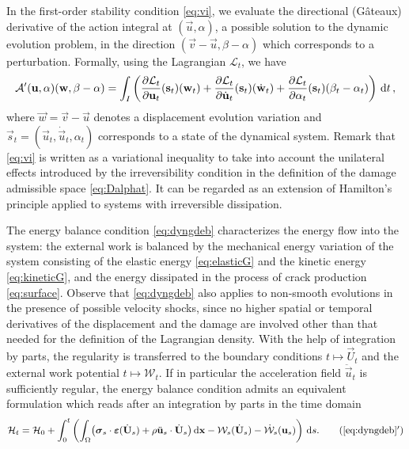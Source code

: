 In the first-order stability condition \eqref{eq:vi}, we evaluate the directional (Gâteaux) derivative of the action integral at $(\vec{u},\alpha)$, a possible solution to the dynamic evolution problem, in the direction $(\vec{v}-\vec{u},\beta-\alpha)$ which corresponds to a perturbation. Formally, using the Lagrangian $\mathcal{L}_t$, we have
\[
\mathcal{A}'(\vec{u},\alpha)(\vec{w},\beta-\alpha)=\int_I\left(\frac{\partial \mathcal{L}_t}{\partial\vec{u}_t}(\vec{s}_t)(\vec{w}_t)+\frac{\partial \mathcal{L}_t}{\partial\dot{\vec{u}}_t}(\vec{s}_t)(\dot{\vec{w}}_t)+\frac{\partial \mathcal{L}_t}{\partial\alpha_t}(\vec{s}_t)(\beta_t-\alpha_t)\right)\D{t}\,,
\]
where $\vec{w}=\vec{v}-\vec{u}$ denotes a displacement evolution variation and $\vec{s}_t=(\vec{u}_t,\dot{\vec{u}}_t,\alpha_t)$ corresponds to a state of the dynamical system. Remark that \eqref{eq:vi} is written as a variational inequality to take into account the unilateral effects introduced by the irreversibility condition in the definition of the damage admissible space \eqref{eq:Dalphat}. It can be regarded as an extension of Hamilton's principle applied to systems with irreversible dissipation.

The energy balance condition \eqref{eq:dyngdeb} characterizes the energy flow into the system: the external work is balanced by the mechanical energy variation of the system consisting of the elastic energy \eqref{eq:elasticG} and the kinetic energy \eqref{eq:kineticG}, and the energy dissipated in the process of crack production \eqref{eq:surface}. Observe that \eqref{eq:dyngdeb} also applies to non-smooth evolutions in the presence of possible velocity shocks, since no higher spatial or temporal derivatives of the displacement and the damage are involved other than that needed for the definition of the Lagrangian density. With the help of integration by parts, the regularity is transferred to the boundary conditions $t\mapsto \vec{U}_t$ and the external work potential $t\mapsto \mathcal{W}_t$. If in particular the acceleration field $\ddot{\vec{u}}_t$ is sufficiently regular, the energy balance condition admits an equivalent formulation which reads after an integration by parts in the time domain
\begin{align} \label{eq:dyngdeb2}
\mathcal{H}_t=\mathcal{H}_0+\int_0^t\left(\int_\Omega\bigl(\sig_s\cdot\eps(\dot{\vec{U}}_s)+\rho\ddot{\vec{u}}_s\cdot\dot{\vec{U}}_s\bigr)\dx-\mathcal{W}_s(\dot{\vec{U}}_s)-\dot{\mathcal{W}}_s(\vec{u}_s)\right)\D{s}. \tag{\ref*{eq:dyngdeb}${}^\prime$}
\end{align}

